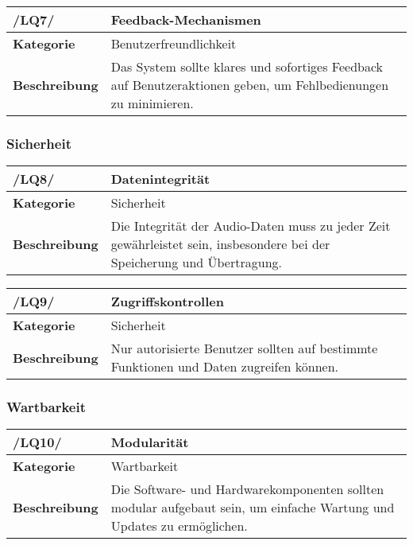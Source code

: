 \begin{table}[h!]
\begin{tabularx}{13cm}{|l|X|}
\hline
\textbf{/LQ7/} & \textbf{Feedback-Mechanismen} \\ \hline
\textbf{Kategorie} & Benutzerfreundlichkeit \\ \hline
\textbf{Beschreibung} & Das System sollte klares und sofortiges Feedback auf Benutzeraktionen geben, um Fehlbedienungen zu minimieren. \\ \hline
\end{tabularx}
\end{table}

\subsubsection{Sicherheit}

\begin{table}[h!]
\begin{tabularx}{13cm}{|l|X|}
\hline
\textbf{/LQ8/} & \textbf{Datenintegrität} \\ \hline
\textbf{Kategorie} & Sicherheit \\ \hline
\textbf{Beschreibung} & Die Integrität der Audio-Daten muss zu jeder Zeit gewährleistet sein, insbesondere bei der Speicherung und Übertragung. \\ \hline
\end{tabularx}
\end{table}

\begin{table}[h!]
\begin{tabularx}{13cm}{|l|X|}
\hline
\textbf{/LQ9/} & \textbf{Zugriffskontrollen} \\ \hline
\textbf{Kategorie} & Sicherheit \\ \hline
\textbf{Beschreibung} & Nur autorisierte Benutzer sollten auf bestimmte Funktionen und Daten zugreifen können. \\ \hline
\end{tabularx}
\end{table}

\subsubsection{Wartbarkeit}

\begin{table}[h!]
\begin{tabularx}{13cm}{|l|X|}
\hline
\textbf{/LQ10/} & \textbf{Modularität} \\ \hline
\textbf{Kategorie} & Wartbarkeit \\ \hline
\textbf{Beschreibung} & Die Software- und Hardwarekomponenten sollten modular aufgebaut sein, um einfache Wartung und Updates zu ermöglichen. \\ \hline
\end{tabularx}
\end{table}

